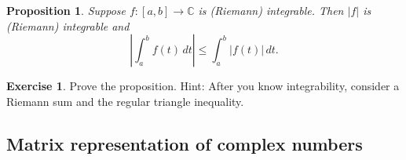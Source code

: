 \documentclass[12pt,openany]{book}
\newcommand{\sabs}[1]{\lvert {#1} \rvert}
\newcommand{\abs}[1]{\left\lvert {#1} \right\rvert}
\newcommand{\C}{{\mathbb{C}}}
\theoremstyle{plain}
\newtheorem{prop}[thm]{Proposition}
\theoremstyle{remark}
\theoremstyle{definition}
\newenvironment{exbox}{%
    \def\FrameCommand{\vrule width 1pt \relax\hspace {10pt}}%
    \MakeFramed {\advance \hsize -\width \FrameRestore }%
}{%
    \endMakeFramed
}
\theoremstyle{exercise}
\newtheorem{exercise}{Exercise}[section]
\theoremstyle{example}
\begin{document}
\begin{prop} \label{prop:inttriangleineq}
Suppose $f \colon [a,b] \to \C$ is (Riemann) integrable.  Then $\sabs{f}$ is
(Riemann) integrable and
\begin{equation*}
\abs{\int_a^b f(t) \, dt} \leq 
\int_a^b \abs{f(t)} \, dt .
\end{equation*}
\end{prop}

\begin{exbox}
\begin{exercise}
Prove the proposition.  Hint: After you know integrability, consider
a Riemann sum and the regular triangle inequality.
\end{exercise}
\end{exbox}


\subsection{Matrix representation of complex numbers}
\end{document}
